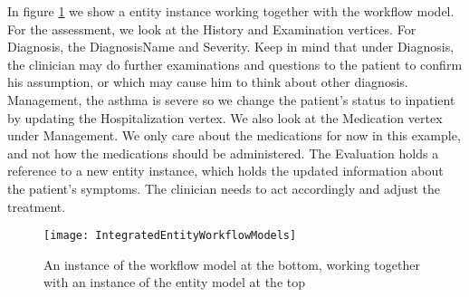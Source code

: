 In figure \ref{fig:IntegratedEntityWorkflowModels} we show a entity instance working together with the workflow model. For the assessment, we look at the History and Examination vertices. For Diagnosis, the DiagnosisName and Severity. Keep in mind that under Diagnosis, the clinician may do further examinations and questions to the patient to confirm his assumption, or which may cause him to think about other diagnosis. Management, the asthma is severe so we change the patient's status to inpatient by updating the Hospitalization vertex. We also look at the Medication vertex under Management. We only care about the medications for now in this example, and not how the medications should be administered. The Evaluation holds a reference to a new entity instance, which holds the updated information about the patient's symptoms. The clinician needs to act accordingly and adjust the treatment.

\begin{figure}[h!]
	\texttt{[image: IntegratedEntityWorkflowModels]}
		\caption {An instance of the workflow model at the bottom, working together with an instance of the entity model at the top}
		\label{fig:IntegratedEntityWorkflowModels}
\end{figure}





